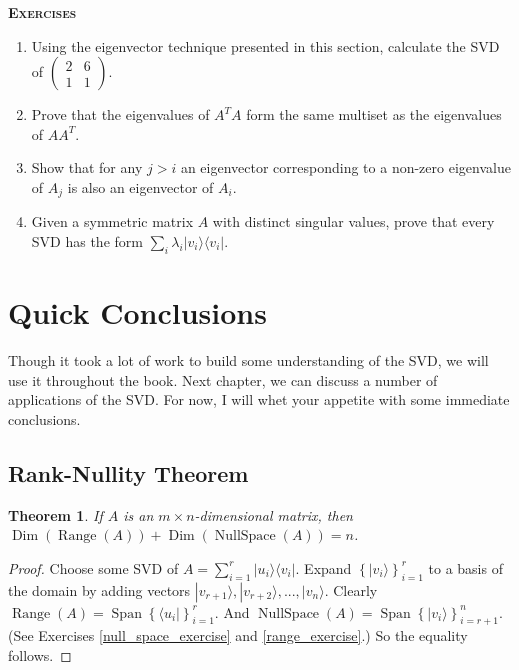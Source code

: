 \documentclass{amsbook}
\newtheorem{theorem}{Theorem}
\begin{document}
{\bfseries\scshape\Large Exercises}

\begin{enumerate}
\item Using the eigenvector technique presented in this section, calculate the SVD of $\left(\begin{array}{cc}2&6\\1&1\end{array}\right)$.
\item Prove that the eigenvalues of $A^TA$ form the same multiset as the eigenvalues of $AA^T$.
\item Show that for any $j>i$ an eigenvector corresponding to a non-zero eigenvalue of $A_j$ is also an eigenvector of $A_i$.
\item Given a symmetric matrix $A$ with distinct singular values, prove that every SVD has the form $\sum_i\lambda_i|v_i\rangle\langle v_i|$.
\end{enumerate}

\section{Quick Conclusions}

Though it took a lot of work to build some understanding of the SVD, we will use it throughout the book.  Next chapter, we can discuss a number of applications of the SVD.  For now, I will whet your appetite with some immediate conclusions.

\subsection{Rank-Nullity Theorem}

 \begin{theorem}
If $A$ is an $m\times n$-dimensional matrix, then $\operatorname{Dim}\left(\operatorname{Range}(A)\right)+\operatorname{Dim}\left(\operatorname{NullSpace}(A)\right)=n$.
 \end{theorem}

\begin{proof}
Choose some SVD of $A=\sum_{i=1}^r|u_i\rangle\langle v_i|$.  Expand $\left\{|v_i\rangle\right\}_{i=1}^r$ to a basis of the domain by adding vectors $|v_{r+1}\rangle, |v_{r+2}\rangle, ..., |v_n\rangle$.  Clearly $\operatorname{Range}(A)=\operatorname{Span}\left\{\langle u_i|\right\}_{i=1}^r$.  And $\operatorname{NullSpace}(A)=\operatorname{Span}\left\{|v_i\rangle\right\}_{i=r+1}^n$.  (See Exercises \ref{null_space_exercise} and \ref{range_exercise}.)  So the equality follows.
\end{proof}
\end{document}

